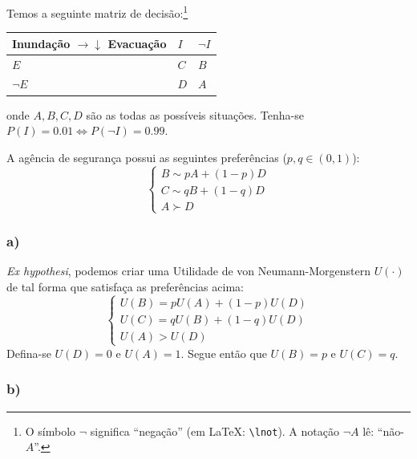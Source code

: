 \documentclass[12pt]{article}
\numberwithin{equation}{section}
\theoremstyle{plain}
\theoremstyle{definition}
\theoremstyle{remark}
\begin{document}
Temos a seguinte matriz de decisão:\footnote{O símbolo \(\lnot\) significa ``negação'' (em LaTeX: \texttt{\textbackslash{}lnot}). A notação \(\lnot A\) lê: ``não-\(A\)''.}

\begin{longtable}[]{@{}lll@{}}
\toprule\noalign{}
Inundação \(\rightarrow\)\(\downarrow\) Evacuação & \(I\) & \(\lnot I\) \\
\midrule\noalign{}
\endhead
\bottomrule\noalign{}
\endlastfoot
\(E\) & \(C\) & \(B\) \\
\(\lnot E\) & \(D\) & \(A\) \\
\end{longtable}

onde \(A, B, C, D\) são as todas as possíveis situações. Tenha-se \(P(I) = 0.01 \iff P(\lnot I) = 0.99\).

A agência de segurança possui as seguintes preferências (\(p, q \in (0,1)\)):
\[
\begin{cases}
B \sim p A + (1-p) D \\
C \sim q B + (1-q) D \\
A \succ D
\end{cases}
\]

\hypertarget{a}{%
\subsubsection{a)}\label{a}}

\textit{Ex hypothesi}, podemos criar uma Utilidade de von Neumann-Morgenstern \(U(\cdot)\) de tal forma que satisfaça as preferências acima:
\[
\begin{cases}
U(B) = p U(A) + (1-p) U(D) \\
U(C) = q U(B) + (1-q) U(D) \\
U(A) > U(D)
\end{cases}
\]
Defina-se \(U(D) = 0\) e \(U(A) = 1\). Segue então que \(U(B) = p\) e \(U(C) = q\).

\hypertarget{b}{%
\subsubsection{b)}\label{b}}
\end{document}
